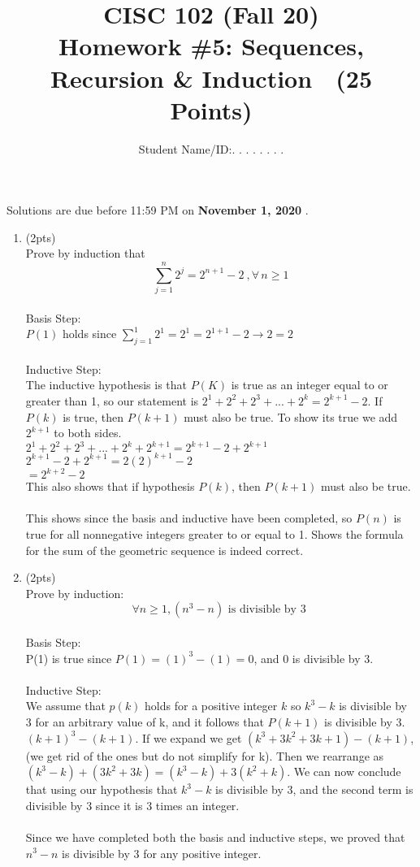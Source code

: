 \documentclass[12pt]{article}
\title{CISC 102 (Fall 20)\\ Homework \#5: Sequences,  Recursion \&  Induction  $\;$   (25 Points) }
\author{Student Name/ID:. . . . . . . .}
\date{}
\begin{document}
\maketitle

\par\noindent Solutions are due before 11:59 PM on \textbf{   November 1, 2020 }.


\begin{enumerate}

\item (2pts) \\
Prove by induction that \[\sum_{j=1}^n 2^j = 2^{n+1} - 2 ~, \forall \, n \ge 1\]
\\Basis Step:
\\$P(1)$ holds since $\sum_{j = 1}^{1} 2^1 = 2^1 = 2^{1+1} - 2 \rightarrow 2 = 2$\\
\\Inductive Step:
\\The inductive hypothesis is that $P(K)$ is true as an integer equal to or greater than 1, so our statement is $2^1 + 2^2 + 2^3 + ... + 2^k = 2^{k +1} - 2$. If $P(k)$ is true, then $P(k + 1)$ must also be true. To show its true we add $2^{k + 1}$ to both sides.
\\$2^1 + 2^2 + 2^3 + ... + 2^k + 2^{k + 1}= 2^{k+ 1} - 2 + 2^{k + 1}$
\\$2^{k + 1} - 2 + 2^{k + 1} = 2(2)^{k + 1} - 2$
\\$= 2^{k+2} - 2$
\\This also shows that if hypothesis $P(k)$, then $P(k + 1)$ must also be true.\\
\\This shows since the basis and inductive have been completed, so $P(n)$ is true for all nonnegative integers greater to or equal to 1. Shows the formula for the sum of the geometric sequence is indeed correct.

\item  (2pts) \\
Prove by induction:
\[\forall n \geq 1, (n^3-n) \text{ is divisible by 3 }\]
\\Basis Step:
\\P(1) is true since $P(1) = (1)^3 - (1) = 0$, and 0 is divisible by 3.\\
\\Inductive Step:
\\We assume that $p(k)$ holds for a positive integer $k$ so $k^3 - k$ is divisible by 3 for an arbitrary value of k, and it follows that $P(k + 1)$ is divisible by 3. $(k + 1)^3 - (k + 1)$. If we expand we get $(k^3 + 3k^2 + 3k + 1) - (k + 1)$, (we get rid of the ones but do not simplify for k). Then we rearrange as $(k^3 - k) + (3k^2 + 3k) = (k^3 - k) + 3(k^2 + k)$. We can now conclude that using our hypothesis that $k^3 - k$ is divisible by 3, and the second term is divisible by 3 since it is 3 times an integer.\\
\\Since we have completed both the basis and inductive steps, we proved that $n^3 - n$ is divisible by 3 for any positive integer.


\end{enumerate}
\end{document}
